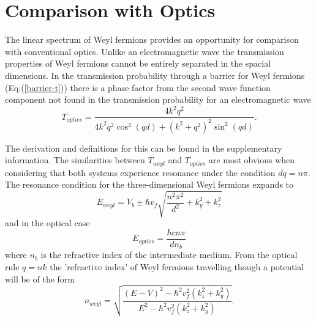 \documentclass[prb,twocolumn,aps,superscriptaddress,showpacs,floatfix]{revtex4}
\begin{document}


\section{Comparison with Optics }

	The linear spectrum of Weyl fermions provides an opportunity for comparison with conventional optics. Unlike an electromagnetic wave the transmission properties of Weyl fermions cannot be entirely separated in the spacial dimensions. In the transmission probability through a barrier for Weyl fermions (Eq.(\ref{barrier-t})) there is a phase factor from the second wave function component not found in the transmission probability for an electromagnetic wave
	\begin{equation}
		T_{optics}=\frac{4k^{2}q^{2}}{4k^{2}q^{2}\cos^{2}\left(qd\right)+\left(k^{2}+q^{2}\right)^{2}\sin^{2}\left(qd\right)}.
	\end{equation}

	The derivation and definitions for this can be found in the supplementary information. The similarities between $T_{weyl}$ and $T_{optics}$ are most obvious when considering that both systems experience resonance under the condition $dq=n\pi$. The resonance condition for the three-dimensional Weyl fermions expands to
	\begin{equation}
		E_{weyl}=V_{b}\pm\hbar v_{f}\sqrt{\frac{n^{2}\pi^{2}}{d^{2}}+k_{y}^{2}+k_{z}^{2}}
	\end{equation}
	and in the optical case
	\begin{equation}
		E_{optics}=\frac{\hbar cn\pi}{dn_{b}}
	\end{equation}
	where $n_{b}$ is the refractive index of the intermediate medium. From the optical rule $q=nk$ the 'refractive index' of Weyl fermions travelling though a potential will be of the form
	\begin{equation}
		n_{weyl}=\sqrt{\frac{\left(E-V\right)^{2}-\hbar^{2} v_{f}^{2}\left(k_{z}^{2}+k_{y}^{2}\right)}{E^{2}-\hbar^{2} v_{f}^{2}\left(k_{z}^{2}+k_{y}^{2}\right)}}.
	\end{equation}
\end{document}
